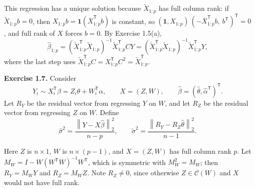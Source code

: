 \documentclass[answers,12pt,addpoints]{exam}
\newcommand{\trans}{^{\mathsf T}}
\newcommand{\normtwo}[1]{\left\lVert #1\right\rVert_2}
\newcommand{\col}{\mathcal{C}}
\newcommand{\ones}{\mathbf{1}}  %
\begin{document}
\begin{questions}
\begin{solution}
This regression has a unique solution because $\widetilde X_{1:p}$ has full column
rank: if $\widetilde X_{1:p}b=0$, then $X_{1:p}b=\ones(\overline X_{1:p}\trans b)$ is
constant, so $(\ones,X_{1:p})\,(-\overline X_{1:p}\trans b,\ b\trans)\trans=0$, and full
rank of $X$ forces $b=0$. By Exercise 1.5(a),
\[
\widehat\beta_{1:p}
=(\widetilde X_{1:p}\trans\widetilde X_{1:p})^{-1}\widetilde X_{1:p}\trans CY
=(\widetilde X_{1:p}\trans\widetilde X_{1:p})^{-1}\widetilde X_{1:p}\trans Y,
\]
where the last step uses
$\widetilde X_{1:p}\trans C=X_{1:p}\trans C^2=\widetilde X_{1:p}\trans$.
\end{solution}
 
\question \textbf{Exercise 1.7.}
Consider
\[
Y_i\sim X_i\trans\beta=Z_i\theta+W_i\trans\alpha,
\qquad X=(Z,W),
\qquad
\widehat\beta=(\widehat\theta,\widehat\alpha\trans)\trans.
\]
Let $R_Y$ be the residual vector from regressing $Y$ on $W$, and let $R_Z$
be the residual vector from regressing $Z$ on $W$.  Define
\[
\widehat\sigma^2
=\frac{\normtwo{Y-X\widehat\beta}^2}{n-p},
\qquad
\widetilde\sigma^2
=\frac{\normtwo{R_Y-R_Z\widehat\theta}^2}{n-1}.
\]
 
 
\begin{solution}
Here $Z$ is $n\times1$, $W$ is $n\times(p-1)$, and $X=(Z,W)$ has full column
rank $p$. Let $M_W=I-W(W\trans W)^{-1}W\trans$, which is symmetric with
$M_W^2=M_W$; then $R_Y=M_WY$ and $R_Z=M_WZ$. Note $R_Z\neq0$, since otherwise
$Z\in\col(W)$ and $X$ would not have full rank.
 

\end{solution}
\end{questions}
\end{document}
